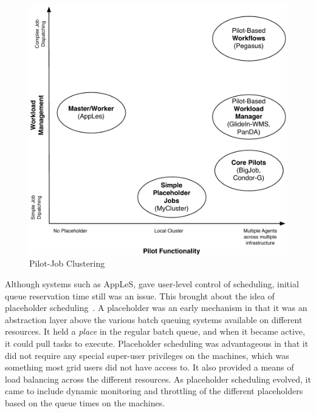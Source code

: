 \documentclass{sig-alternate}
\begin{document}
\begin{figure}[t]
	\centering
		\includegraphics[width=.45\textwidth]{figures/pilotjob-clustering.pdf}
	\caption{Pilot-Job Clustering}
	\label{fig:figures_pilotjob-clustering}
\end{figure}


Although systems such as AppLeS, gave user-level control of scheduling, initial
queue reservation time still was an issue.
This brought about the idea of placeholder
scheduling~\cite{Pinchak02practicalheterogeneous}.  A placeholder was
an early \pilot mechanism in that it was an abstraction layer above
the various batch queuing systems available on different resources.
It held a \textit{place} in the regular batch queue, and when it
became active, it could pull tasks to execute.  Placeholder scheduling
was advantageous in that it did not require any special super-user
privileges on the machines, which was something most grid users did
not have access to.  It also provided a means of load balancing across
the different resources.  As placeholder scheduling evolved, it came
to include dynamic monitoring and throttling of the different
placeholders based on the queue times on the machines.


\end{document}
